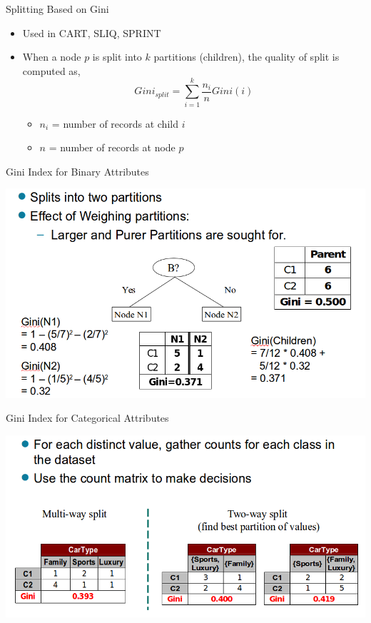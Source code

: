 \documentclass{beamer}
\begin{document}
\begin{frame}{Splitting Based on Gini}
    \begin{itemize}
        \item Used in CART, SLIQ, SPRINT
        \item When a node $p$ is split into $k$ partitions (children), the quality of split is computed as,
                $$ Gini_{split} = \sum_{i=1}^{k} \frac{n_i}{n} Gini(i) $$
        \begin{itemize}
            \item $n_i$ =  number of records at child $i$
            \item $n$ =  number of records at node $p$
        \end{itemize}
    \end{itemize}
\end{frame}
\begin{frame}{Gini Index for Binary Attributes}
    \begin{center}
        \includegraphics[scale=0.4]{giniIndex3.png}
    \end{center}
\end{frame}
\begin{frame}{Gini Index for Categorical Attributes}
    \begin{center}
        \includegraphics[scale=0.4]{giniIndex4.png}
    \end{center}
\end{frame}
\end{document}
